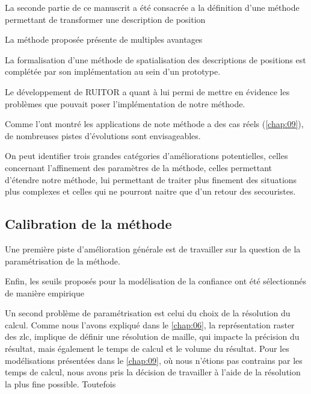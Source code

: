 La seconde partie de ce manuscrit a été consacrée a la définition
d'une méthode permettant de transformer une description de position





La méthode proposée présente de multiples avantages







La formalisation d'une méthode de spatialisation des descriptions de
positions est complétée par son implémentation au sein d'un prototype.





Le développement de RUITOR a quant à lui permi de mettre en évidence
les problèmes que pouvait poser l'implémentation de notre méthode.


Comme l'ont montré les applications de note méthode a des cas réels
(\autoref{chap:09}), de nombreuses pistes d'évolutions sont
envisageables.

On peut identifier trois grandes catégories d'améliorations
potentielles, celles concernant l'affinement des paramètres de la
méthode, celles permettant d'étendre notre méthode, lui permettant de
traiter plus finement des situations plus complexes et celles qui ne
pourront naitre que d'un retour des secouristes.

\subsection*{Calibration de la méthode}

Une première piste d'amélioration générale est de travailler sur la
question de la paramétrisation de la méthode. 



Enfin, les seuils proposés pour la modélisation de la confiance ont
été sélectionnés de manière empirique


Un second problème de paramétrisation est celui du choix de la
résolution du calcul. Comme nous l'avons expliqué dans le
\autoref{chap:06}, la représentation raster des \ac{zlc}, implique de
définir une résolution de maille, qui impacte la précision du
résultat, mais également le temps de calcul et le volume du
résultat. Pour les modélisations présentées dans le \autoref{chap:09},
où nous n'étions pas contrains par les temps de calcul, nous avons
pris la décision de travailler à l'aide de la résolution la plus fine
possible. Toutefois


